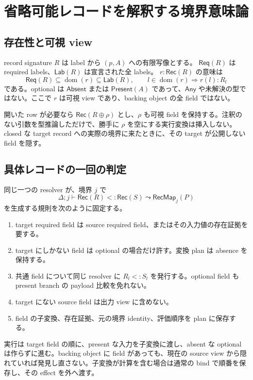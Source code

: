 \documentclass[11pt,a4paper]{article}
\theoremstyle{remark}
\newcommand{\dom}{\operatorname{dom}}
\begin{document}
\section{省略可能レコードを解釈する境界意味論}

\subsection{存在性と可視 view}

record signature $R$ は label から $(p,A)$ への有限写像とする。
$\mathsf{Req}(R)$ は required labels、$\mathsf{Lab}(R)$ は宣言された全 labels。
$r:\mathsf{Rec}(R)$ の意味は
\[
\mathsf{Req}(R)\subseteq\dom(r)\subseteq\mathsf{Lab}(R),
\qquad
l\in\dom(r)\Longrightarrow r(l):R_l
\]
である。optional は $\mathsf{Absent}$ または $\mathsf{Present}(A)$ であって、$\mathsf{Any}$ や未解決の型ではない。ここで $r$ は可視 view であり、backing object の全 field ではない。

開いた row が必要なら $\mathsf{Rec}(R\oplus\rho)$ とし、$\rho$ も可視 field を保持する。注釈のない引数を型推論しただけで、勝手に $\rho$ を空にする実行変換は挿入しない。closed な target record への実際の境界に来たときに、その target が公開しない field を隠す。

\subsection{具体レコードの一回の判定}

同じ一つの resolver が、境界 $j$ で
\[
\Delta;j\vdash \mathsf{Rec}(R)<:\mathsf{Rec}(S)
  \leadsto \mathsf{RecMap}_j(P)
\]
を生成する規則を次のように固定する。
\begin{enumerate}
\item target required field は source required field、またはその入力値の存在証拠を要する。
\item target にしかない field は optional の場合だけ許す。変換 plan は absence を保持する。
\item 共通 field について同じ resolver に $R_l<:S_l$ を発行する。optional field も present branch の payload 比較を免れない。
\item target にない source field は出力 view に含めない。
\item field の子変換、存在証拠、元の境界 identity、評価順序を plan に保存する。
\end{enumerate}
実行は target field の順に、present な入力を子変換に渡し、absent な optional は作らずに進む。backing object に field があっても、現在の source view から隠れていれば発見し直さない。子変換が計算を含む場合は通常の bind で順番を保存し、その effect を外へ渡す。
\end{document}
